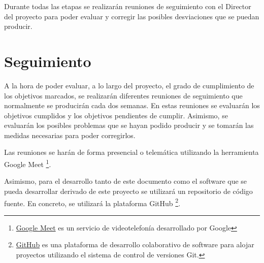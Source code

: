 Durante todas las etapas se realizarán reuniones de seguimiento con el Director del proyecto para
poder evaluar y corregir las posibles desviaciones que se puedan producir.

\section{Seguimiento}
\label{sec:metodologia:seguimiento}


A la hora de poder evaluar, a lo largo del proyecto, el grado de cumplimiento de los objetivos
marcados, se realizarán diferentes reuniones de seguimiento que normalmente se producirán cada
dos semanas. En estas reuniones se evaluarán los objetivos cumplidos y los objetivos pendientes
de cumplir. Asimismo, se evaluarán los posibles problemas que se hayan podido producir y se
tomarán las medidas necesarias para poder corregirlos.

Las reuniones se harán de forma presencial o telemática utilizando la herramienta Google Meet
\footnote{\href{https://meet.google.com/}{Google Meet} es un servicio de videotelefonía desarrollado por Google}.

Asimismo, para el desarrollo tanto de este documento como el software que se pueda desarrollar derivado
de este proyecto se utilizará un repositorio de código fuente. En concreto, se utilizará la plataforma
GitHub \footnote{\href{https://github.com/}{GitHub} es una plataforma de desarrollo colaborativo de software
para alojar proyectos utilizando el sistema de control de versiones Git.}.

